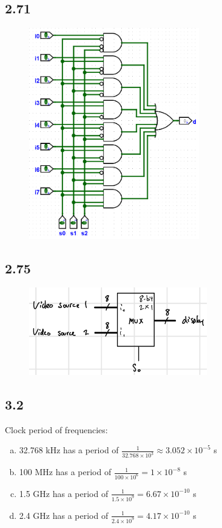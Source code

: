 \documentclass{article}
\begin{document}
\subsection*{2.71}
\begin{figure}[H]
    \centering
    \includegraphics[width=0.66\textwidth]{./images/2_71.png}
\end{figure}

\subsection*{2.75}
\begin{figure}[H]
    \centering
    \includegraphics[width=0.69\textwidth]{./images/2_75.jpg}
\end{figure}

\newpage
\subsection*{3.2}
Clock period of frequencies:
\begin{enumerate}[(a)]
    \item 32.768 kHz has a period of $\frac{1}{32.768 \times 10^3} \approx 3.052 \times 10^{-5}$ s
    \item 100 MHz has a period of $\frac{1}{100 \times 10^6} = 1 \times 10^{-8}$ s
    \item 1.5 GHz has a period of $\frac{1}{1.5 \times 10^9} = 6.67 \times 10^{-10}$ s
    \item 2.4 GHz has a period of $\frac{1}{2.4 \times 10^9} = 4.17 \times 10^{-10}$ s
\end{enumerate}
\end{document}
